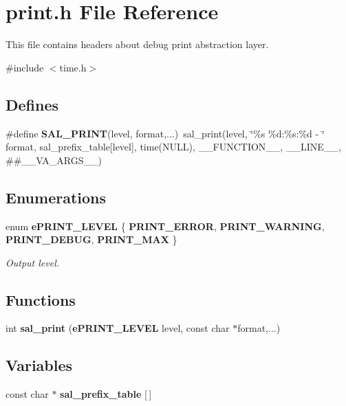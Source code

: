 \section{print.h File Reference}
\label{print_8h}


This file contains headers about debug print abstraction layer.  


{\ttfamily \#include $<$time.h$>$}\par
\subsection*{Defines}
\begin{DoxyCompactItemize}
\item 
\#define {\bfseries SAL\_\-PRINT}(level, format,...)~sal\_\-print(level, \char`\"{}\%s \%d:\%s:\%d -\/ \char`\"{} format, sal\_\-prefix\_\-table[level], time(NULL), \_\-\_\-FUNCTION\_\-\_\-, \_\-\_\-LINE\_\-\_\-, \#\#\_\-\_\-VA\_\-ARGS\_\-\_\-)\label{print_8h_ab3d9093cccdef7b8de0404541d56c8c0}

\end{DoxyCompactItemize}
\subsection*{Enumerations}
\begin{DoxyCompactItemize}
\item 
enum {\bf ePRINT\_\-LEVEL} \{ {\bf PRINT\_\-ERROR}, 
{\bf PRINT\_\-WARNING}, 
{\bf PRINT\_\-DEBUG}, 
{\bf PRINT\_\-MAX}
 \}
\begin{DoxyCompactList}\small\item\em Output level. \end{DoxyCompactList}\end{DoxyCompactItemize}
\subsection*{Functions}
\begin{DoxyCompactItemize}
\item 
int {\bfseries sal\_\-print} ({\bf ePRINT\_\-LEVEL} level, const char $\ast$format,...)\label{print_8h_af40aeac8b51d7a37f1578496051e03f6}

\end{DoxyCompactItemize}
\subsection*{Variables}
\begin{DoxyCompactItemize}
\item 
const char $\ast$ {\bfseries sal\_\-prefix\_\-table} [$\,$]\label{print_8h_ac25f7c37b7cbbeeecab54734dc680d62}

\end{DoxyCompactItemize}


